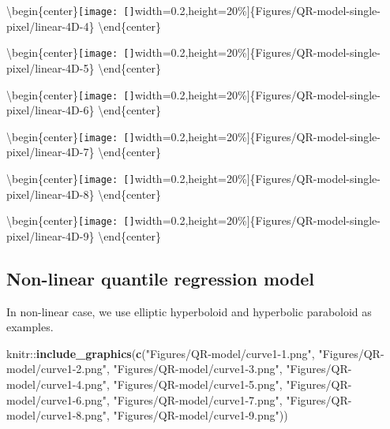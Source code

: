 \documentclass[11pt,a4paper,]{article}
\newenvironment{Shaded}{\begin{snugshade}}{\end{snugshade}}
\newcommand{\KeywordTok}[1]{\textcolor[rgb]{0.13,0.29,0.53}{\textbf{{#1}}}}
\newcommand{\StringTok}[1]{\textcolor[rgb]{0.31,0.60,0.02}{{#1}}}
\newcommand{\NormalTok}[1]{{#1}}
\theoremstyle{definition}
\theoremstyle{definition}
\theoremstyle{remark}
\begin{document}
\textbackslash{}begin\{center\}\texttt{[image: []}width=0.2\linewidth,height=20\%{]}\{Figures/QR-model-single-pixel/linear-4D-4\}
\textbackslash{}end\{center\}

\textbackslash{}begin\{center\}\texttt{[image: []}width=0.2\linewidth,height=20\%{]}\{Figures/QR-model-single-pixel/linear-4D-5\}
\textbackslash{}end\{center\}

\textbackslash{}begin\{center\}\texttt{[image: []}width=0.2\linewidth,height=20\%{]}\{Figures/QR-model-single-pixel/linear-4D-6\}
\textbackslash{}end\{center\}

\textbackslash{}begin\{center\}\texttt{[image: []}width=0.2\linewidth,height=20\%{]}\{Figures/QR-model-single-pixel/linear-4D-7\}
\textbackslash{}end\{center\}

\textbackslash{}begin\{center\}\texttt{[image: []}width=0.2\linewidth,height=20\%{]}\{Figures/QR-model-single-pixel/linear-4D-8\}
\textbackslash{}end\{center\}

\textbackslash{}begin\{center\}\texttt{[image: []}width=0.2\linewidth,height=20\%{]}\{Figures/QR-model-single-pixel/linear-4D-9\}
\textbackslash{}end\{center\}

\subsection{Non-linear quantile regression
model}\label{non-linear-quantile-regression-model}

In non-linear case, we use elliptic hyperboloid and hyperbolic
paraboloid as examples.

\begin{Shaded}
\begin{Highlighting}[]
\NormalTok{knitr::}\KeywordTok{include_graphics}\NormalTok{(}\KeywordTok{c}\NormalTok{(}\StringTok{"Figures/QR-model/curve1-1.png"}\NormalTok{,}
                          \StringTok{"Figures/QR-model/curve1-2.png"}\NormalTok{,}
                          \StringTok{"Figures/QR-model/curve1-3.png"}\NormalTok{,}
                          \StringTok{"Figures/QR-model/curve1-4.png"}\NormalTok{,}
                          \StringTok{"Figures/QR-model/curve1-5.png"}\NormalTok{,}
                          \StringTok{"Figures/QR-model/curve1-6.png"}\NormalTok{,}
                          \StringTok{"Figures/QR-model/curve1-7.png"}\NormalTok{,}
                          \StringTok{"Figures/QR-model/curve1-8.png"}\NormalTok{,}
                          \StringTok{"Figures/QR-model/curve1-9.png"}\NormalTok{))}
\end{Highlighting}
\end{Shaded}
\end{document}
